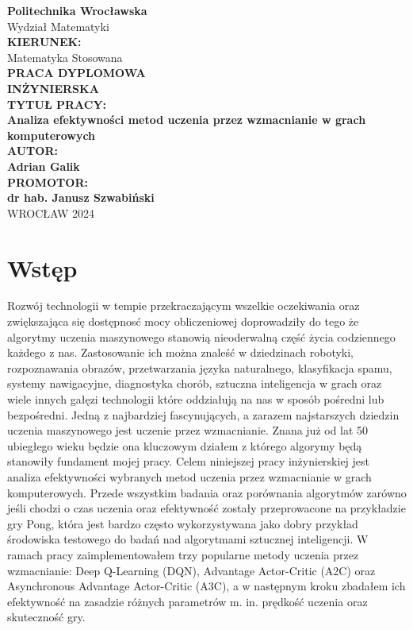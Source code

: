 \documentclass[a4paper, 12pt]{article}
\begin{document}
    \thispagestyle{empty}

    \begin{center}
        \textbf{\LARGE Politechnika Wrocławska} \\[1em]
        \Large Wydział Matematyki \\[2em]

        \textbf{KIERUNEK:} \\
        \Large Matematyka Stosowana \\[2em]

        \textbf{\LARGE PRACA DYPLOMOWA \\[0.5em] INŻYNIERSKA} \\[6em]

        \textbf{\large TYTUŁ PRACY:} \\[1em]
        \textbf{\Large Analiza efektywności metod uczenia przez wzmacnianie w grach komputerowych} \\[2em]

        \textbf{\large AUTOR:} \\[1em]
        \textbf{\Large Adrian Galik} \\[2em]

        \textbf{\large PROMOTOR:} \\[1em]
        \textbf{\Large dr hab. Janusz Szwabiński } \\[10em]

        WROCŁAW 2024
    \end{center}

    \newpage
    \section{Wstęp}
    \indent Rozwój technologii w tempie przekraczającym wszelkie oczekiwania oraz zwiększająca się dostępnosć mocy
    obliczeniowej doprowadziły do tego że algorytmy uczenia maszynowego stanowią nieoderwalną część życia codziennego
    każdego z nas. Zastosowanie ich można znaleść w dziedzinach robotyki, rozpoznawania obrazów, przetwarzania
    języka naturalnego, klasyfikacja spamu, systemy nawigacyjne, diagnostyka chorób, sztuczna inteligencja w grach oraz
    wiele innych gałęzi technologii które oddziałują na nas w sposób pośredni lub bezpośredni. Jedną z najbardziej 
    fascynujących, a zarazem najstarszych dziedzin uczenia maszynowego jest uczenie przez wzmacnianie. Znana już od lat 50 ubiegłego wieku
    będzie ona kluczowym działem z którego algorymy będą stanowiły fundament mojej pracy.
    \newline
    \indent Celem niniejszej pracy inżynierskiej jest analiza efektywności wybranych metod uczenia
    przez wzmacnianie w grach komputerowych. Przede wszystkim badania oraz porównania algorytmów zarówno jeśli chodzi o czas uczenia
    oraz efektywność zostały przeprowacone na przykładzie gry Pong, która jest bardzo często wykorzystywana jako dobry przykład środowiska testowego
    do badań nad algorytmami sztucznej inteligencji. W ramach pracy zaimplementowałem trzy popularne metody uczenia przez wzmacnianie:
    Deep Q-Learning (DQN), Advantage Actor-Critic (A2C) oraz Asynchronous Advantage Actor-Critic (A3C), a w następnym kroku zbadałem ich efektywność
    na zasadzie różnych parametrów m. in. prędkość uczenia oraz skuteczność gry.
\end{document}
